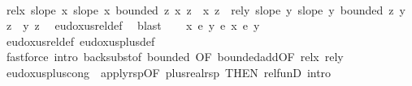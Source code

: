 \begin{isabellebody}
\ \ \isamarkupfalse%
\ rel{\isacharunderscore}{\kern0pt}x{\isacharcolon}{\kern0pt}\ {\isachardoublequoteopen}slope\ x{\isachardoublequoteclose}\ {\isachardoublequoteopen}slope\ x{\isacharprime}{\kern0pt}{\isachardoublequoteclose}\ {\isachardoublequoteopen}bounded\ {\isacharparenleft}{\kern0pt}{\isasymlambda}z{\isachardot}{\kern0pt}\ x\ z\ {\isacharminus}{\kern0pt}\ x{\isacharprime}{\kern0pt}\ z{\isacharparenright}{\kern0pt}{\isachardoublequoteclose}\ \ rel{\isacharunderscore}{\kern0pt}y{\isacharcolon}{\kern0pt}\ {\isachardoublequoteopen}slope\ y{\isachardoublequoteclose}\ {\isachardoublequoteopen}slope\ y{\isacharprime}{\kern0pt}{\isachardoublequoteclose}\ {\isachardoublequoteopen}bounded\ {\isacharparenleft}{\kern0pt}{\isasymlambda}z{\isachardot}{\kern0pt}\ y\ z\ {\isacharminus}{\kern0pt}\ y{\isacharprime}{\kern0pt}\ z{\isacharparenright}{\kern0pt}{\isachardoublequoteclose}\ \isamarkupfalse%
\ eudoxus{\isacharunderscore}{\kern0pt}rel{\isacharunderscore}{\kern0pt}def\ \isamarkupfalse%
\ blast{\isacharplus}{\kern0pt}\isanewline
\ \ \isamarkupfalse%
\ {\isachardoublequoteopen}{\isacharparenleft}{\kern0pt}x\ {\isacharplus}{\kern0pt}\isactrlsub e\ y{\isacharparenright}{\kern0pt}\ {\isasymsim}\isactrlsub e\ {\isacharparenleft}{\kern0pt}x{\isacharprime}{\kern0pt}\ {\isacharplus}{\kern0pt}\isactrlsub e\ y{\isacharprime}{\kern0pt}{\isacharparenright}{\kern0pt}{\isachardoublequoteclose}\ \isamarkupfalse%
\ eudoxus{\isacharunderscore}{\kern0pt}rel{\isacharunderscore}{\kern0pt}def\ eudoxus{\isacharunderscore}{\kern0pt}plus{\isacharunderscore}{\kern0pt}def\ \isamarkupfalse%
\ {\isacharparenleft}{\kern0pt}fastforce\ intro{\isacharcolon}{\kern0pt}\ back{\isacharunderscore}{\kern0pt}subst{\isacharbrackleft}{\kern0pt}of\ bounded{\isacharcomma}{\kern0pt}\ OF\ bounded{\isacharunderscore}{\kern0pt}add{\isacharbrackleft}{\kern0pt}OF\ rel{\isacharunderscore}{\kern0pt}x{\isacharparenleft}{\kern0pt}{}{\isacharparenright}{\kern0pt}\ rel{\isacharunderscore}{\kern0pt}y{\isacharparenleft}{\kern0pt}{}{\isacharparenright}{\kern0pt}{\isacharbrackright}{\kern0pt}{\isacharbrackright}{\kern0pt}{\isacharparenright}{\kern0pt}\isanewline
{}\isamarkupfalse%
%
\endisatagproof
{\isafoldproof}%
%
\isadelimproof
\isanewline
%
\endisadelimproof
\isanewline
{}\isamarkupfalse%
\ eudoxus{\isacharunderscore}{\kern0pt}plus{\isacharunderscore}{\kern0pt}cong\ {\isacharequal}{\kern0pt}\ apply{\isacharunderscore}{\kern0pt}rsp{\isacharprime}{\kern0pt}{\isacharbrackleft}{\kern0pt}OF\ plus{\isacharunderscore}{\kern0pt}real{\isachardot}{\kern0pt}rsp{\isacharcomma}{\kern0pt}\ THEN\ rel{\isacharunderscore}{\kern0pt}funD{\isacharcomma}{\kern0pt}\ intro{\isacharbrackright}{\kern0pt}\isanewline

\end{isabellebody}
